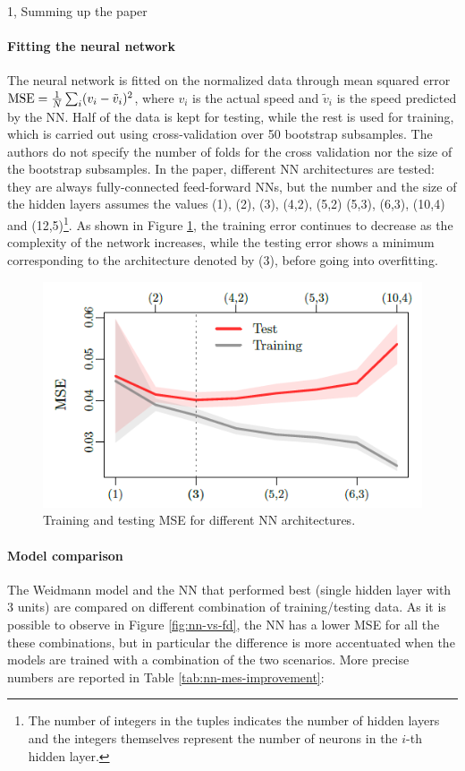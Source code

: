 \documentclass[10pt,a4paper]{article}
\begin{document}
\begin{task}{1, Summing up the paper}
\paragraph{Fitting the neural network}
The neural network is fitted on the normalized data through mean squared error $\text{MSE} = \frac{1}{N} \sum_i (v_i - \Tilde{v}_i)^2$, where $v_i$ is the actual speed and $\tilde{v}_i$ is the speed predicted by the NN.
Half of the data is kept for testing, while the rest is used for training, which is carried out using cross-validation over 50 bootstrap subsamples.
The authors do not specify the number of folds for the cross validation nor the size of the bootstrap subsamples.
In the paper, different NN architectures are tested: they are always fully-connected feed-forward NNs, but the number and the size of the hidden layers assumes the values (1), (2), (3), (4,2), (5,2) (5,3), (6,3), (10,4) and (12,5)\footnote{The number of integers in the tuples indicates the number of hidden layers and the integers themselves represent the number of neurons in the $i$-th hidden layer.}.
As shown in Figure \ref{fig:nn-training-curves}, the training error continues to decrease as the complexity of the network increases, while the testing error shows a minimum corresponding to the architecture denoted by (3), before going into overfitting.

\begin{figure}[h]
    \centering
    \includegraphics[scale=0.92]{images/NN_architectures_comparison_MSE.png}
    \caption{Training and testing MSE for different NN architectures.}
    \label{fig:nn-training-curves}
\end{figure}

\paragraph{Model comparison}
The Weidmann model and the NN that performed best (single hidden layer with 3 units) are compared on different combination of training/testing data.
As it is possible to observe in Figure \ref{fig:nn-vs-fd}, the NN has a lower MSE for all the these combinations, but in particular the difference is more accentuated when the models are trained with a combination of the two scenarios.
More precise numbers are reported in Table \ref{tab:nn-mes-improvement}:


\end{task}
\end{document}
